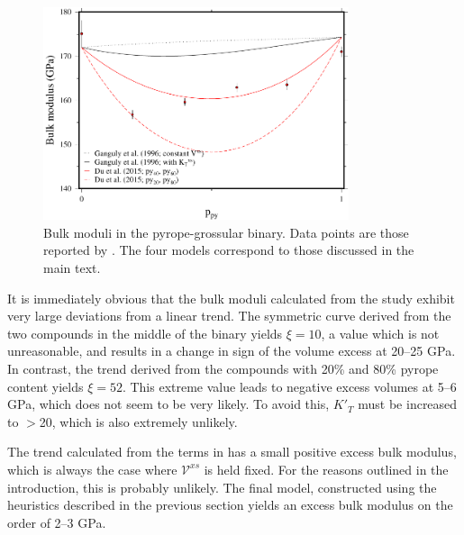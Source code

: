\documentclass[review]{elsarticle}
\begin{document}
\begin{figure}[ht!]
  \centering
  \includegraphics[width=0.8\textwidth]{figures/pyrope_grossular_K_0}
  \caption{Bulk moduli in the pyrope-grossular binary. Data points are those reported by \cite{DCW2015}. The four models correspond to those discussed in the main text.}
  \label{fig:K_T_pyrope_grossular}
\end{figure}

It is immediately obvious that the bulk moduli calculated from the \cite{DCW2015} study exhibit very large deviations from a linear trend. The symmetric curve derived from the two compounds in the middle of the binary yields $\xi=10$, a value which is not unreasonable, and results in a change in sign of the volume excess at 20--25 GPa. In contrast, the trend derived from the compounds with 20\% and 80\% pyrope content yields $\xi=52$. This extreme value leads to negative excess volumes at 5--6 GPa, which does not seem to be very likely. To avoid this, $K'_T$ must be increased to $>$20, which is also extremely unlikely.

The trend calculated from the terms in \cite{GCT1996} has a small positive excess bulk modulus, which is always the case where $\mathcal{V}^{xs}$ is held fixed. For the reasons outlined in the introduction, this is probably unlikely. The final model, constructed using the heuristics described in the previous section yields an excess bulk modulus on the order of 2--3 GPa.
\end{document}
